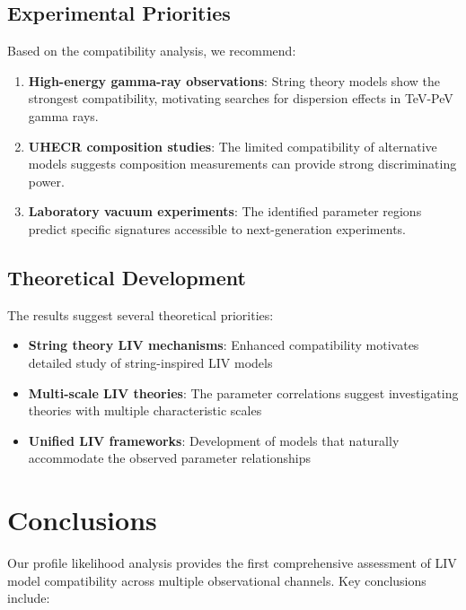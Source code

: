 \documentclass[11pt]{article}
\begin{document}
\subsection{Experimental Priorities}

Based on the compatibility analysis, we recommend:

\begin{enumerate}
    \item \textbf{High-energy gamma-ray observations}: String theory models show the strongest compatibility, motivating searches for dispersion effects in TeV-PeV gamma rays.

    \item \textbf{UHECR composition studies}: The limited compatibility of alternative models suggests composition measurements can provide strong discriminating power.

    \item \textbf{Laboratory vacuum experiments}: The identified parameter regions predict specific signatures accessible to next-generation experiments.
\end{enumerate}

\subsection{Theoretical Development}

The results suggest several theoretical priorities:

\begin{itemize}
    \item \textbf{String theory LIV mechanisms}: Enhanced compatibility motivates detailed study of string-inspired LIV models
    \item \textbf{Multi-scale LIV theories}: The parameter correlations suggest investigating theories with multiple characteristic scales
    \item \textbf{Unified LIV frameworks}: Development of models that naturally accommodate the observed parameter relationships
\end{itemize}

\section{Conclusions}

Our profile likelihood analysis provides the first comprehensive assessment of LIV model compatibility across multiple observational channels. Key conclusions include:
\end{document}
